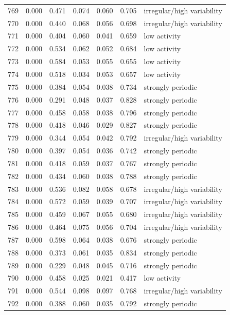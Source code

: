 \begin{longtable}{lrrrrrl}
769 & 0.000 & 0.471 & 0.074 & 0.060 & 0.705 & irregular/high variability \\
770 & 0.000 & 0.440 & 0.068 & 0.056 & 0.698 & irregular/high variability \\
771 & 0.000 & 0.404 & 0.060 & 0.041 & 0.659 & low activity \\
772 & 0.000 & 0.534 & 0.062 & 0.052 & 0.684 & low activity \\
773 & 0.000 & 0.584 & 0.053 & 0.055 & 0.655 & low activity \\
774 & 0.000 & 0.518 & 0.034 & 0.053 & 0.657 & low activity \\
775 & 0.000 & 0.384 & 0.054 & 0.038 & 0.734 & strongly periodic \\
776 & 0.000 & 0.291 & 0.048 & 0.037 & 0.828 & strongly periodic \\
777 & 0.000 & 0.458 & 0.058 & 0.038 & 0.796 & strongly periodic \\
778 & 0.000 & 0.418 & 0.046 & 0.029 & 0.827 & strongly periodic \\
779 & 0.000 & 0.344 & 0.054 & 0.042 & 0.792 & irregular/high variability \\
780 & 0.000 & 0.397 & 0.054 & 0.036 & 0.742 & strongly periodic \\
781 & 0.000 & 0.418 & 0.059 & 0.037 & 0.767 & strongly periodic \\
782 & 0.000 & 0.434 & 0.060 & 0.038 & 0.788 & strongly periodic \\
783 & 0.000 & 0.536 & 0.082 & 0.058 & 0.678 & irregular/high variability \\
784 & 0.000 & 0.572 & 0.059 & 0.039 & 0.707 & irregular/high variability \\
785 & 0.000 & 0.459 & 0.067 & 0.055 & 0.680 & irregular/high variability \\
786 & 0.000 & 0.464 & 0.075 & 0.056 & 0.704 & irregular/high variability \\
787 & 0.000 & 0.598 & 0.064 & 0.038 & 0.676 & strongly periodic \\
788 & 0.000 & 0.373 & 0.061 & 0.035 & 0.834 & strongly periodic \\
789 & 0.000 & 0.229 & 0.048 & 0.045 & 0.716 & strongly periodic \\
790 & 0.000 & 0.458 & 0.025 & 0.021 & 0.417 & low activity \\
791 & 0.000 & 0.544 & 0.098 & 0.097 & 0.768 & irregular/high variability \\
792 & 0.000 & 0.388 & 0.060 & 0.035 & 0.792 & strongly periodic \\

\end{longtable}
